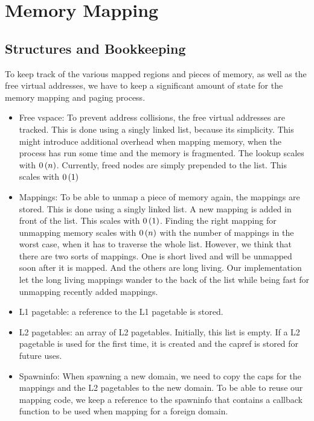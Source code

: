 \section{Memory Mapping}\label{s:mapping}

\subsection{Structures and Bookkeeping}\label{ss:mapping_structures}

To keep track of the various mapped regions and pieces of memory, as well as 
the free virtual addresses, we have to keep a significant amount of state for 
the memory mapping and paging process.

\begin{itemize}
	\item Free vspace: To prevent address collisions, the free virtual 
    addresses are tracked. This is done using a singly linked list, because 
    its simplicity. This might introduce additional overhead when mapping 
    memory, when the process has run some time and the memory is fragmented. 
    The lookup scales with $0\left( n \right)$. Currently, freed nodes are simply 
    prepended to the list. This scales with $0\left( 1 \right)$ 

	\item Mappings: To be able to unmap a piece of memory again, the mappings 
    are stored. This is done using a singly linked list. A new mapping is 
    added in front of the list. This scales with $0\left( 1 \right)$. Finding the 
    right mapping for unmapping memory scales with $0\left( n \right)$ with the 
    number of mappings in the worst case, when it has to traverse the whole 
    list. However, we think that there are two sorts of mappings. One is short 
    lived and will be unmapped soon after it is mapped. And the others are 
    long living. Our implementation let the long living mappings wander to the 
    back of the list while being fast for unmapping recently added mappings.

	\item L1 pagetable: a reference to the L1 pagetable is stored.

	\item L2 pagetables: an array of L2 pagetables. Initially, this list is 
    empty. If a L2 pagetable is used for the first time, it is created and the 
    capref is stored for future uses.

	\item Spawninfo: When spawning a new domain, we need to copy the caps for 
    the mappings and the L2 pagetables to the new domain. To be able to reuse 
    our mapping code, we keep a reference to the spawninfo that contains a 
    callback function to be used when mapping for a foreign domain.
\end{itemize}

